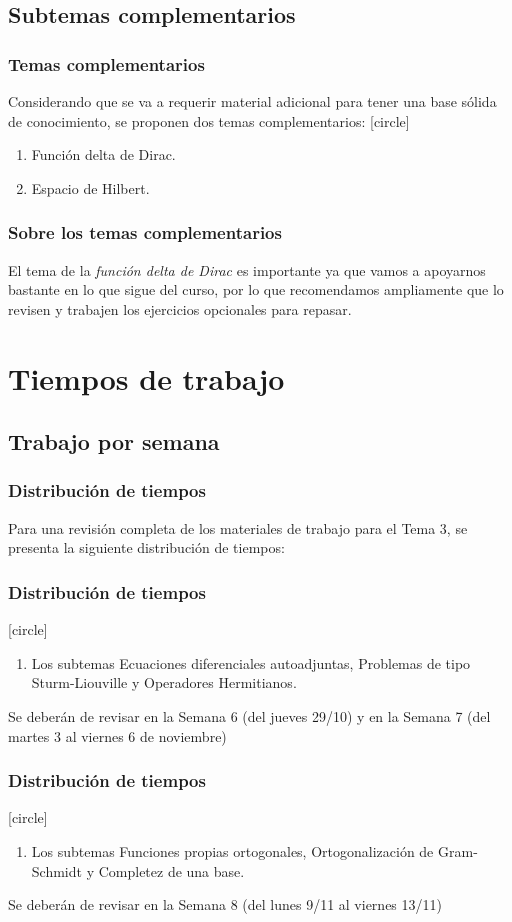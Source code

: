\subsection{Subtemas complementarios}
\begin{frame}
\frametitle{Temas complementarios}
Considerando que se va a requerir material adicional para tener una base sólida de conocimiento, se proponen dos temas complementarios:
[circle]
\begin{enumerate}[<+->]
\item Función delta de Dirac.
\item Espacio de Hilbert.
\end{enumerate}
\end{frame}
\begin{frame}
\frametitle{Sobre los temas complementarios}
El tema de la \emph{función delta de Dirac} es importante ya que vamos a apoyarnos bastante en lo que sigue del curso, por lo que recomendamos ampliamente que lo revisen y trabajen los ejercicios opcionales para repasar.
\end{frame}
\section{Tiempos de trabajo}
\subsection{Trabajo por semana}
\begin{frame}
\frametitle{Distribución de tiempos}
Para una revisión completa de los materiales de trabajo para el Tema 3, se presenta la siguiente distribución de tiempos:
\end{frame}
\begin{frame}
\frametitle{Distribución de tiempos}
[circle]
\begin{enumerate}
\item Los subtemas Ecuaciones diferenciales autoadjuntas, Problemas de tipo Sturm-Liouville y Operadores Hermitianos.
\end{enumerate}
Se deberán de revisar en la Semana 6 (del jueves 29/10) y en la Semana 7 (del martes 3 al viernes 6 de noviembre)
\end{frame}
\begin{frame}
\frametitle{Distribución de tiempos}
[circle]
\begin{enumerate}
\item Los subtemas Funciones propias ortogonales, Ortogonalización de Gram-Schmidt y Completez de una base.
\end{enumerate}
Se deberán de revisar en la Semana 8 (del lunes 9/11 al viernes 13/11)
\end{frame}
